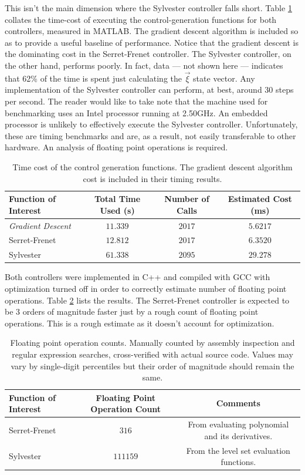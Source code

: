 This isn't the main dimension where the Sylvester controller falls short. Table \ref{tab:perf_simple} collates the time-cost of executing the control-generation functions for both controllers, measured in MATLAB. The gradient descent algorithm is included so as to provide a useful baseline of performance. Notice that the gradient descent is the dominating cost in the Serret-Frenet controller. The Sylvester controller, on the other hand, performs poorly. In fact, data --- not shown here --- indicates that 62\% of the time is spent just calculating the $\vec{\xi}$ state vector. Any implementation of the Sylvester controller can perform, at best, around 30 steps per second. The reader would like to take note that the machine used for benchmarking uses an Intel processor running at 2.50GHz. An embedded processor is unlikely to effectively execute the Sylvester controller. Unfortunately, these are timing benchmarks and are, as a result, not easily transferable to other hardware. An analysis of floating point operations is required.
\begin{table}[!htbp]
    \centering
    \begin{tabular}{l|c|c|c}
        Function of Interest & Total Time Used (s) & Number of Calls & Estimated Cost (ms) \\ \hline
        \emph{Gradient Descent} & $11.339$ & $2017$ & $5.6217$\\ \hline
        Serret-Frenet & $12.812$ & $2017$ & $6.3520$ \\ \hline
        Sylvester & $61.338$ & $2095$ & $29.278$
    \end{tabular}
    \caption{Time cost of the control generation functions. The gradient descent algorithm cost is included in their timing results.}
    \label{tab:perf_simple}
\end{table}
Both controllers were implemented in C++ and compiled with GCC with optimization turned off in order to correctly estimate number of floating point operations. Table \ref{tab:perf_flop} lists the results. The Serret-Frenet controller is expected to be 3 orders of magnitude faster just by a rough count of floating point operations. This is a rough estimate as it doesn't account for optimization.
\begin{table}[!htbp]
    \centering
    \begin{tabular}{l|c|c}
        Function of Interest & Floating Point Operation Count & Comments\\ \hline
        Serret-Frenet & $316$ & From evaluating polynomial and its derivatives.\\  \hline
        Sylvester & $111159$ & From the level set evaluation functions.
    \end{tabular}
    \caption{Floating point operation counts. Manually counted by assembly inspection and regular expression searches, cross-verified with actual source code. Values may vary by single-digit percentiles but their order of magnitude should remain the same.}
    \label{tab:perf_flop}
\end{table}

